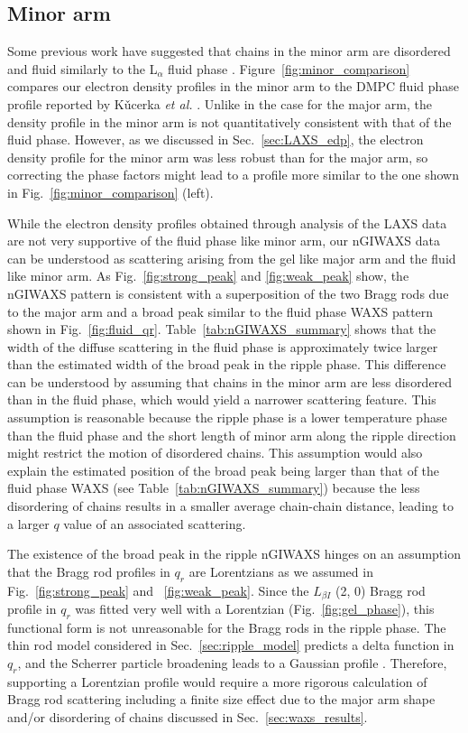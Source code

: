 \subsection{Minor arm}
Some previous work have suggested that chains in the minor arm are disordered 
and fluid similarly to the L$_\alpha$ fluid phase \cite{ref:Schneider83,ref:Sun96,ref:Pabst04,ref:Riske09}.
Figure~\ref{fig:minor_comparison} compares our electron density profiles
in the minor arm to the DMPC fluid phase profile reported by 
K\v{u}cerka \textit{et al.} \cite{Kucerka05_BPJ}.
Unlike in the case for the major arm, the density profile in the minor arm
is not quantitatively consistent with that of the fluid phase. 
However, as we discussed in Sec.~\ref{sec:LAXS_edp}, the electron density profile
for the minor arm was less robust than for the major arm,
so correcting the phase factors might lead to a profile more similar 
to the one shown in Fig.~\ref{fig:minor_comparison} (left).

While the electron density profiles obtained through analysis of the LAXS data
are not very supportive of the fluid phase like minor arm,
our nGIWAXS data can be understood as scattering
arising from the gel like major arm and the fluid like minor arm. 
As Fig.~\ref{fig:strong_peak} and \ref{fig:weak_peak} show,
the nGIWAXS pattern is consistent with a superposition of 
the two Bragg rods due to the major arm and
a broad peak similar to the fluid phase 
WAXS pattern shown in Fig.~\ref{fig:fluid_qr}. 
Table~\ref{tab:nGIWAXS_summary} shows that 
the width of the diffuse scattering in the fluid phase is approximately twice
larger than the estimated width of the broad peak in the ripple phase.
This difference can be understood by assuming that chains in the minor arm
are less disordered than in the fluid phase, which would yield a narrower
scattering feature. 
This assumption is reasonable because the ripple phase is a lower temperature
phase than the fluid phase and the short length of minor arm along the 
ripple direction might restrict the motion of disordered chains. 
This assumption would also explain the estimated position 
of the broad peak being larger than that of the fluid phase WAXS
(see Table~\ref{tab:nGIWAXS_summary})
because the less disordering of chains results in a smaller average chain-chain
distance, leading to a larger $q$ value of an associated scattering.

The existence of the broad peak in the ripple nGIWAXS hinges
on an assumption that the Bragg rod profiles in $q_r$ are Lorentzians 
as we assumed in Fig.~\ref{fig:strong_peak} and ~\ref{fig:weak_peak}.
Since the $L_{\beta I}$ (2, 0) Bragg rod profile in $q_r$ was fitted very well
with a Lorentzian (Fig.~\ref{fig:gel_phase}), this functional form is
not unreasonable for the Bragg rods in the ripple phase.
The thin rod model considered in Sec.~\ref{sec:ripple_model} predicts
a delta function in $q_r$, and the Scherrer particle broadening leads to
a Gaussian profile \cite{ref:Warren69}. 
Therefore, supporting a Lorentzian profile would require
a more rigorous calculation of Bragg rod scattering including a finite size effect
due to the major arm shape and/or disordering of chains discussed in
Sec.~\ref{sec:waxs_results}. 

